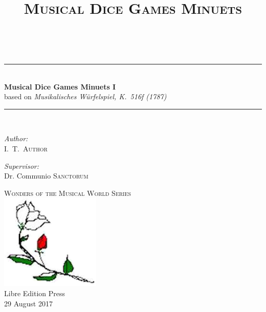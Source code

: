 \documentclass[letterpaper,x11names,svgnames,10pt]{article}
\title{\textsc{Musical Dice Games Minuets \volNumber}}
\author{\textsc{\authorFirstMidNameInit \authorLastName}}
\date{\textsc{\dateGenerated}}
\def\authorFirstMidNameInit{I.\ T.\ }
\def\authorLastName{Author}
\def\dateGenerated{29 August 2017}
\def\volNumber{I}
\newcommand{\HRule}{\rule{\linewidth}{0.5mm}}
\begin{document}


\newpage
{
	${}_{}$\\
	\vspace{1.00in}	
	\thispagestyle{empty}
	\begin{center}
		\HRule \\[0.4cm]
		{ \huge \bfseries Musical Dice Games Minuets \volNumber} \\[0.2cm]
		{\large based on {\em Musikalisches W\"{u}rfelspiel, K.\ 516f (1787)} }\\[0.2cm]
		\HRule \\[1.5cm]
		\begin{minipage}{0.4\textwidth}
			\begin{flushleft} \large
				\emph{Author:}\\
				\authorFirstMidNameInit \textsc{\authorLastName}
			\end{flushleft}
		\end{minipage}
		\begin{minipage}{0.4\textwidth}
			\begin{flushright} \large
				\emph{Supervisor:} \\
				Dr. Communio \textsc{Sanctorum}
			\end{flushright}
		\end{minipage}
		\vfill
		{\textsc{\Large Wonders of the Musical World Series}}  \\[0.2cm] 
		\includegraphics*[width=0.15\linewidth]{../images/1.png}\\ 
		{\large Libre Edition Press \\
		         \dateGenerated }\\
		\vspace{2.50in}
	\end{center}
	\newpage
	
	
	\tableofcontents\label{tabofcon}
	

}
\end{document}
